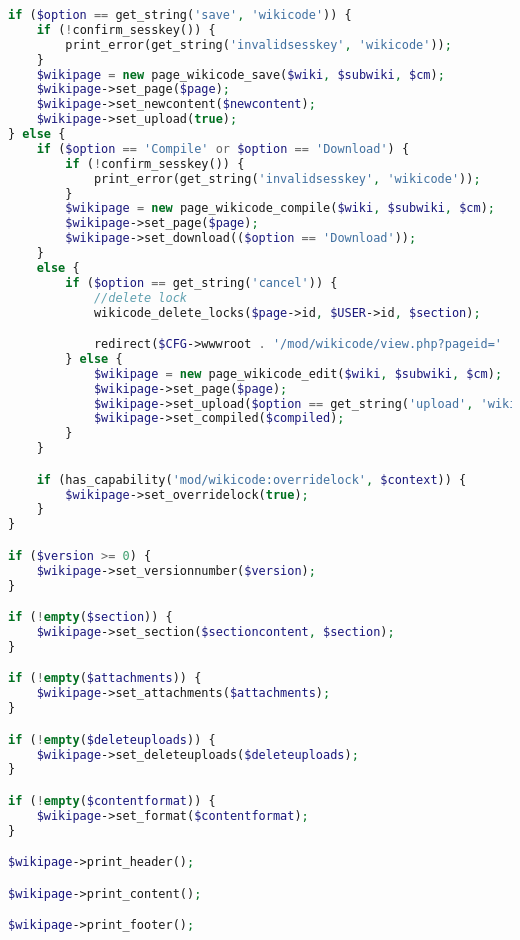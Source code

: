 \begin{lstlisting}[language=PHP]
if ($option == get_string('save', 'wikicode')) {
    if (!confirm_sesskey()) {
        print_error(get_string('invalidsesskey', 'wikicode'));
    }
    $wikipage = new page_wikicode_save($wiki, $subwiki, $cm);
    $wikipage->set_page($page);
    $wikipage->set_newcontent($newcontent);
    $wikipage->set_upload(true);
} else {  
    if ($option == 'Compile' or $option == 'Download') {
        if (!confirm_sesskey()) {
            print_error(get_string('invalidsesskey', 'wikicode'));
        }
        $wikipage = new page_wikicode_compile($wiki, $subwiki, $cm);
        $wikipage->set_page($page);
		$wikipage->set_download(($option == 'Download'));
    }
	else {
        if ($option == get_string('cancel')) {
            //delete lock
            wikicode_delete_locks($page->id, $USER->id, $section);

            redirect($CFG->wwwroot . '/mod/wikicode/view.php?pageid=' . $pageid);
        } else {
            $wikipage = new page_wikicode_edit($wiki, $subwiki, $cm);
            $wikipage->set_page($page);
            $wikipage->set_upload($option == get_string('upload', 'wikicode'));
			$wikipage->set_compiled($compiled);
        }
    }

    if (has_capability('mod/wikicode:overridelock', $context)) {
        $wikipage->set_overridelock(true);
    }
}

if ($version >= 0) {
    $wikipage->set_versionnumber($version);
}

if (!empty($section)) {
    $wikipage->set_section($sectioncontent, $section);
}

if (!empty($attachments)) {
    $wikipage->set_attachments($attachments);
}

if (!empty($deleteuploads)) {
    $wikipage->set_deleteuploads($deleteuploads);
}

if (!empty($contentformat)) {
    $wikipage->set_format($contentformat);
}

$wikipage->print_header();

$wikipage->print_content();

$wikipage->print_footer();
\end{lstlisting}

